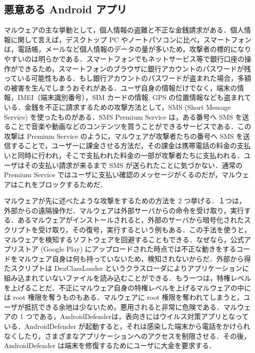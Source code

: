 \documentclass[12pt]{jsarticle}
\begin{document}
\subsection{悪意ある Android  アプリ}
\label{sec:malware}
マルウェアの主な挙動として，個人情報の盗難と不正な金銭請求がある．個人情報に関して言えば，デスクトップ PC やノートパソコンに比べ，スマートフォンは，電話帳，メールなど個人情報のデータの量が多いため，攻撃者の標的になりやすいのは明らかである．スマートフォンでもネットサービス等で銀行口座の操作ができるため，スマートフォンのブラウザに銀行アカウントのパスワードが残っている可能性もある．もし銀行アカウントのパスワードが盗まれた場合，多額の被害を生んでしまうおそれがある．ユーザ自身の情報だけでなく，端末の情報，IMEI（端末識別番号），SIM カードの情報, GPS の位置情報なども盗まれている．金銭を不正に請求するための攻撃方法として，SMS (Short Message Service) を使ったものがある．SMS Premium Service は，ある番号へ SMS を送ることで音楽や動画などのコンテンツを買うことができるサービスである．この攻撃は Premium Service のように，マルウェアが攻撃者たちの番号へ SMS を送信することで，ユーザーに課金させる方法だ，その課金は携帯電話の料金の支払いと同時に行われ，そこで支払われた料金の一部が攻撃者たちに支払われる．ユーザはその支払い請求が来るまで SMS が送られたことに気づかない．通常の Premium Service ではユーザに支払い確認のメッセージがくるのだが，マルウェアはこれをブロックするためだ．

マルウェアが先に述べたような攻撃をするための方法を 2 つ挙げる．１つは，外部からの遠隔操作だ．マルウェアは外部サーバからの命令を受け取り，実行する．あるマルウェアがインストールされると，外部のサーバから暗号化されたスクリプトを受け取り，その復号，実行するという例もある．この手法を使うと，マルウェアを検知するソフトウェアを回避することもできる．なぜなら，公式アプリストア (Google Play)  にアップロードされた時点では不正な動きをするコードをマルウェア自身は何も持っていないため，検知されないからだ．外部から得たスクリプトは DexClassLoader というクラスローダによりアプリケーションに組み込まれていないファイルを読み込むことができる．もう一つは，特権レベルを上げることだ．不正にマルウェア自身の特権レベルを上げるマルウェアの中には root 権限を奪うものもある．マルウェアに root 権限を奪われてしまうと，ユーザが抵抗できる余地は少ないため，悪用されると非常に危険である．マルウェアの 1 つである，AndroidDefenderは，表向きにはウイルス対策アプリとなっている．AndroidDefender が起動すると，それは感染した端末から電話をかけられなくしたり，さまざまなアプリケーションへのアクセスを制限させる．その後，AndroidDefender は端末を修復するためにユーザに大金を要求する．
 
\end{document}
